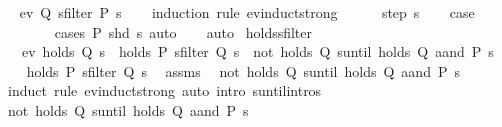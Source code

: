\begin{isabellebody}
\ \isamarkupfalse%
\ {\isachardoublequoteopen}ev\ Q\ {\isacharparenleft}sfilter\ P\ s{\isacharparenright}{\isachardoublequoteclose}\isanewline
\ \ \isamarkupfalse%
\ {\isacharparenleft}induction\ rule{\isacharcolon}\ ev{\isacharunderscore}induct{\isacharunderscore}strong{\isacharparenright}\isanewline
\ \ \ \ \isamarkupfalse%
\ {\isacharparenleft}step\ s{\isacharparenright}\ \isamarkupfalse%
\ \isamarkupfalse%
\ {\isacharquery}case\isanewline
\ \ \ \ \ \ \isamarkupfalse%
\ {\isacharparenleft}cases\ {\isachardoublequoteopen}P\ {\isacharparenleft}shd\ s{\isacharparenright}{\isachardoublequoteclose}{\isacharparenright}\ auto\isanewline
\ \ \isamarkupfalse%
\ auto\isanewline
{}\isamarkupfalse%
%
\endisatagproof
{\isafoldproof}%
%
\isadelimproof
\isanewline
%
\endisadelimproof
\isanewline
{}\isamarkupfalse%
\ holds{\isacharunderscore}sfilter{\isacharcolon}\isanewline
\ \ \ {\isachardoublequoteopen}ev\ {\isacharparenleft}holds\ Q{\isacharparenright}\ s{\isachardoublequoteclose}\ \ {\isachardoublequoteopen}holds\ P\ {\isacharparenleft}sfilter\ Q\ s{\isacharparenright}\ {\isasymlongleftrightarrow}\ {\isacharparenleft}not\ {\isacharparenleft}holds\ Q{\isacharparenright}\ suntil\ {\isacharparenleft}holds\ {\isacharparenleft}Q\ aand\ P{\isacharparenright}{\isacharparenright}{\isacharparenright}\ s{\isachardoublequoteclose}\isanewline
%
\isadelimproof
%
\endisadelimproof
%
\isatagproof
{}\isamarkupfalse%
\isanewline
\ \ \isamarkupfalse%
\ {\isachardoublequoteopen}holds\ P\ {\isacharparenleft}sfilter\ Q\ s{\isacharparenright}{\isachardoublequoteclose}\ \isamarkupfalse%
\ assms\ \isamarkupfalse%
\ {\isachardoublequoteopen}{\isacharparenleft}not\ {\isacharparenleft}holds\ Q{\isacharparenright}\ suntil\ {\isacharparenleft}holds\ {\isacharparenleft}Q\ aand\ P{\isacharparenright}{\isacharparenright}{\isacharparenright}\ s{\isachardoublequoteclose}\isanewline
\ \ \ \ \isamarkupfalse%
\ {\isacharparenleft}induct\ rule{\isacharcolon}\ ev{\isacharunderscore}induct{\isacharunderscore}strong{\isacharparenright}\ {\isacharparenleft}auto\ intro{\isacharcolon}\ suntil{\isachardot}intros{\isacharparenright}\isanewline
{}\isamarkupfalse%
\isanewline
\ \ \isamarkupfalse%
\ {\isachardoublequoteopen}{\isacharparenleft}not\ {\isacharparenleft}holds\ Q{\isacharparenright}\ suntil\ {\isacharparenleft}holds\ {\isacharparenleft}Q\ aand\ P{\isacharparenright}{\isacharparenright}{\isacharparenright}\ s{\isachardoublequoteclose}\ \isamarkupfalse%

\end{isabellebody}
